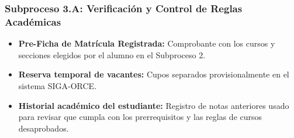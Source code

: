 \subsubsection{Subproceso 3.A: Verificación y Control de Reglas Académicas}

\begin{itemize}
    \item \textbf{Pre-Ficha de Matrícula Registrada:} Comprobante con los cursos y secciones elegidos por el alumno en el Subproceso 2.

    \item \textbf{Reserva temporal de vacantes:} Cupos separados provisionalmente en el sistema SIGA-ORCE.

    \item \textbf{Historial académico del estudiante:} Registro de notas anteriores usado para revisar que cumpla con los prerrequisitos y las reglas de cursos desaprobados.
\end{itemize}